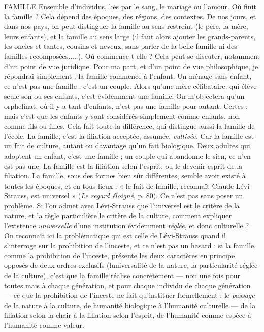 FAMILLE Ensemble d'individus, liés par le sang, le mariage ou l'amour.
Où finit la famille ? Cela dépend des époques, des régions, des
contextes. De nos jours, et dans nos pays, on peut distinguer la famille au sens
restreint (le père, la mère, leurs enfants), et la famille au sens large (il faut alors
ajouter les grands-parents, les oncles et tantes, cousins et neveux, sans parler de
la belle-famille ni des familles recomposées.....). Où commence-t-elle ? Cela
peut se discuter, notamment d’un point de vue juridique. Pour ma part, et
d’un point de vue philosophique, je répondrai simplement : la famille commence
à l'enfant. Un ménage sans enfant, ce n’est pas une famille : c’est un
couple. Alors qu’une mère célibataire, qui élève seule son ou ses enfants, c’est
évidemment une famille. On m'objectera qu’un orphelinat, où il y a tant
d’enfants, n’est pas une famille pour autant. Certes ; mais c’est que les enfants
y sont considérés simplement comme enfants, non comme fils ou filles. Cela
fait toute la différence, qui distingue aussi la famille de l’école. La famille, c’est
la filiation acceptée, assumée, {\it cultivée}. Car la famille est un fait de culture,
autant ou davantage qu’un fait biologique. Deux adultes qui adoptent un
enfant, c’est une famille ; un couple qui abandonne le sien, ce n’en est pas une.
La famille est la filiation selon l'esprit, ou le devenir-esprit de la filiation.
La famille, sous des formes bien sûr différentes, semble avoir existé à toutes
les époques, et en tous lieux : « le fait de famille, reconnaît Claude Lévi-Strauss,
est universel » ({\it Le regard éloigné}, p. 80). Ce n’est pas sans poser un problème.
Si l’on admet avec Lévi-Strauss que l’universel est le critère de la nature, et la
règle particulière le critère de la culture, comment expliquer l'existence {\it universelle}
d’une institution évidemment {\it réglée}, et donc culturelle ? On reconnaît ici
la problématique qui est celle de Lévi-Strauss quand il s'interroge sur la prohibition
de l'inceste, et ce n’est pas un hasard : si la famille, comme la prohibition
de l'inceste, présente les deux caractères en principe opposés de deux ordres
exclusifs (luniversalité de la nature, la particularité réglée de la culture), c’est
que la famille réalise concrètement — non une fois pour toutes mais à chaque
génération, et pour chaque individu de chaque génération — ce que la prohibition
de l’inceste ne fait qu’instituer formellement : le {\it passage} de la nature à la
culture, de humanité biologique à l’humanité culturelle — de la filiation selon
la chair à la filiation selon l'esprit, de l'humanité comme espèce à l’humanité
comme valeur.

